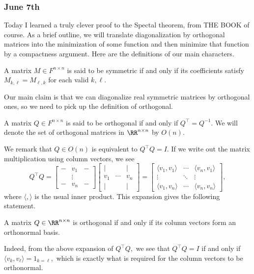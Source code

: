 \subsubsection{June 7th}
Today I learned a truly clever proof to the Spectal theorem, from THE BOOK of course. As a brief outline, we will translate diagonalization by orthogonal matrices into the minimization of some function and then minimize that function by a compactness argument. Here are the definitions of our main characters.
\begin{definition}
    A matrix $M\in F^{n\times n}$ is said to be symmetric if and only if its coefficients satisfy $M_{k,\ell}=M_{\ell,k}$ for each valid $k,\ell.$
\end{definition}
Our main claim is that we can diagonalize real symmetric matrices by orthogonal ones, so we need to pick up the definition of orthogonal.
\begin{definition}
    A matrix $Q\in F^{n\times n}$ is said to be orthogonal if and only if $Q^\intercal=Q^{-1}.$ We will denote the set of orthogonal matrices in $\RR^{n\times n}$ by $O(n).$
\end{definition}
We remark that $Q\in O(n)$ is equivalent to $Q^\intercal Q=I.$ If we write out the matrix multiplication using column vectors, we see
\[Q^\intercal Q=\begin{bmatrix}
    - & v_1 & - \\
    & \vdots & \\
    - & v_n & -
\end{bmatrix}\begin{bmatrix}
    | & & | \\
    v_1 & \cdots & v_n \\
    | & & |
\end{bmatrix}=\begin{bmatrix}
    \langle v_1,v_1\rangle & \cdots & \langle v_n,v_1\rangle \\
    \vdots & \ddots & \vdots \\
    \langle v_1,v_n\rangle & \cdots & \langle v_n,v_n\rangle
\end{bmatrix},\]
where $\langle,\rangle$ is the usual inner product. This expansion gives the following statement.
\begin{proposition}
    A matrix $Q\in\RR^{n\times n}$ is orthogonal if and only if its column vectors form an orthonormal basis.
\end{proposition}
Indeed, from the above expansion of $Q^\intercal Q,$ we see that $Q^\intercal Q=I$ if and only if $\langle v_k,v_\ell\rangle=1_{k=\ell},$ which is exactly what is required for the column vectors to be orthonormal.

